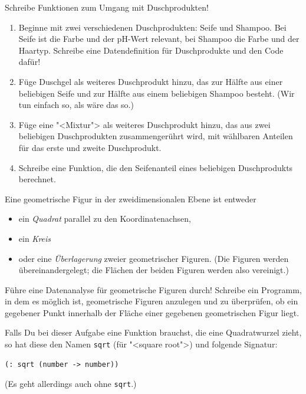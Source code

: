 \begin{aufgabe}
  Schreibe Funktionen zum Umgang mit Duschprodukten!
  \begin{enumerate}
  \item Beginne mit zwei verschiedenen Duschprodukten: Seife und
    Shampoo.  Bei Seife ist die Farbe und der pH-Wert relevant, bei
    Shampoo die Farbe und der Haartyp.  Schreibe eine Datendefinition
    für Duschprodukte und den Code dafür!
  \item Füge Duschgel als weiteres Duschprodukt hinzu, das zur Hälfte
    aus einer beliebigen Seife und zur Hälfte aus einem beliebigen
    Shampoo besteht.  (Wir tun einfach so, als wäre das so.)
  \item Füge eine "<Mixtur"> als weiteres Duschprodukt hinzu, das aus
    zwei beliebigen Duschprodukten zusammengerührt wird, mit 
    wählbaren Anteilen für das erste und zweite Duschprodukt.
  \item Schreibe eine Funktion, die den Seifenanteil eines beliebigen
    Duschprodukts berechnet.
  \end{enumerate}
\end{aufgabe}

\begin{aufgabe}
\item Eine geometrische Figur in der zweidimensionalen Ebene ist entweder
%
\begin{itemize}
\item ein \textit{Quadrat} parallel zu den Koordinatenachsen,
\item ein \textit{Kreis}
\item oder eine \textit{Überlagerung} zweier geometrischer Figuren.
  (Die Figuren werden übereinandergelegt; die Flächen der beiden Figuren werden also vereinigt.)
\end{itemize}
%
Führe eine Datenanalyse für geometrische Figuren durch! Schreibe
ein Programm, in dem es möglich ist, geometrische Figuren anzulegen
und zu überprüfen, ob ein gegebener Punkt innerhalb der Fläche einer
gegebenen geometrischen Figur liegt.

Falls Du bei dieser Aufgabe eine Funktion brauchst, die eine
Quadratwurzel zieht, so hat diese den Namen
\lstinline{sqrt} (für "<square root">) und
folgende Signatur:
\begin{lstlisting}
(: sqrt (number -> number))
\end{lstlisting}
%
(Es geht allerdings auch ohne \lstinline{sqrt}.)
\end{aufgabe}

